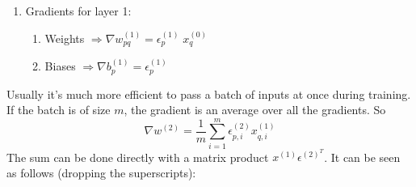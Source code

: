 \documentclass{article}
\begin{document}
\begin{enumerate}
    \item Gradients for layer 1: 
    \begin{enumerate}
        \item Weights ${\Rightarrow\nabla w_{pq}^{(1)}} = \epsilon_p^{(1)}\;x_q^{(0)}$
    \item Biases $\Rightarrow{\nabla{b}_p^{(1)}} = \epsilon_p^{(1)}$
    \end{enumerate}
    
\end{enumerate}

Usually it's much more efficient to pass a batch of inputs at once during training. If the batch is of size $m$, the gradient is an average over all the gradients. So 
    \[\nabla w^{(2)}_{} = \frac{1}{m}\sum_{i=1}^m\epsilon^{(2)}_{p,i} x^{(1)}_{q,i}\]
    The sum can be done directly with a matrix product $x^{(1)}\epsilon^{(2)^T}$. It can be seen as follows (dropping the superscripts): 
\end{document}
